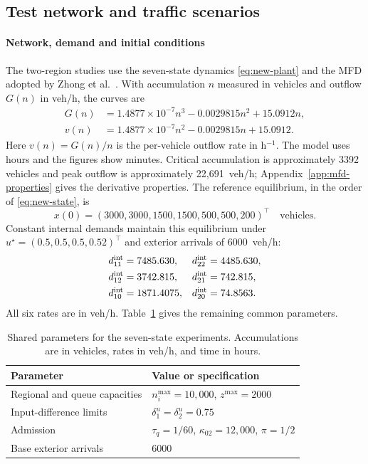 \documentclass[final]{cas-sc}
\theoremstyle{definition}
\theoremstyle{plain}
\theoremstyle{definition}
\theoremstyle{plain}
\newcommand{\appref}[1]{Appendix~\ref{#1}}
\begin{document}
\subsection{Test network and traffic scenarios}
\label{sec:experimental-setup}

\paragraph{Network, demand and initial conditions}
The two-region studies use the seven-state dynamics \eqref{eq:new-plant}
and the MFD adopted by Zhong et al.~\cite{zhong2018robust}. With
accumulation $n$ measured in vehicles and outflow $G(n)$ in veh/h,
the curves are
\begin{equation}
\begin{aligned}
G(n)&=1.4877\times10^{-7}n^3-0.0029815n^2+15.0912n,\\
v(n)&=1.4877\times10^{-7}n^2-0.0029815n+15.0912.
\end{aligned}
\label{eq:new-mfd}
\end{equation}
Here $v(n)=G(n)/n$ is the per-vehicle outflow rate in h$^{-1}$.
The model uses hours and the figures show minutes. Critical accumulation
is approximately 3392 vehicles and peak outflow is approximately
22,691~veh/h; \appref{app:mfd-properties} gives the derivative properties.
The reference equilibrium, in the order of \eqref{eq:new-state}, is
\[
x(0)=(3000,3000,1500,1500,500,500,200)^\top\quad\text{vehicles}.
\]
Constant internal demands maintain this equilibrium under
$u^\star=(0.5,0.5,0.5,0.52)^\top$ and exterior arrivals of 6000~veh/h:
\begin{equation}
\begin{aligned}
d_{11}^{\rm int}&=7485.630,  & d_{22}^{\rm int}&=4485.630,\\
d_{12}^{\rm int}&=3742.815,  & d_{21}^{\rm int}&=742.815,\\
d_{10}^{\rm int}&=1871.4075, & d_{20}^{\rm int}&=74.8563.
\end{aligned}
\label{eq:new-incident-demands}
\end{equation}
All six rates are in veh/h. Table~\ref{tab:experiment-parameters} gives
the remaining common parameters.
\begin{table}[pos=!htb]
\centering\small
\caption{Shared parameters for the seven-state experiments. Accumulations
are in vehicles, rates in veh/h, and time in hours.}
\label{tab:experiment-parameters}
\begin{tabularx}{\linewidth}{@{}lX@{}}
\toprule
Parameter & Value or specification\\
\midrule
Regional and queue capacities & $n_i^{\max}=10{,}000$, $z^{\max}=2000$\\
Input-difference limits & $\delta_1^u=\delta_2^u=0.75$\\
Admission & $\tau_q=1/60$, $\kappa_{02}=12{,}000$, $\pi=1/2$\\
Base exterior arrivals & $6000$\\
\bottomrule
\end{tabularx}
\end{table}
\end{document}

